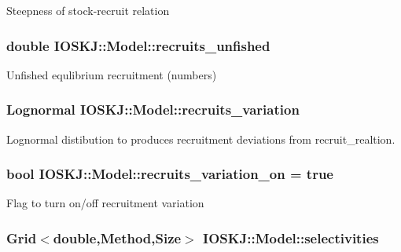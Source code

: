 Steepness of stock-\/recruit relation \hypertarget{classIOSKJ_1_1Model_a780f4e69674141e96e028765004608ea}{
\subsubsection[{recruits\-\_\-unfished}]{\setlength{\rightskip}{0pt plus 5cm}double I\-O\-S\-K\-J\-::\-Model\-::recruits\-\_\-unfished}}\label{classIOSKJ_1_1Model_a780f4e69674141e96e028765004608ea}
Unfished equlibrium recruitment (numbers) \hypertarget{classIOSKJ_1_1Model_ad9518caa30a28b5ae7afa7677e33bca2}{
\subsubsection[{recruits\-\_\-variation}]{\setlength{\rightskip}{0pt plus 5cm}Lognormal I\-O\-S\-K\-J\-::\-Model\-::recruits\-\_\-variation}}\label{classIOSKJ_1_1Model_ad9518caa30a28b5ae7afa7677e33bca2}
Lognormal distibution to produces recruitment deviations from recruit\-\_\-realtion. \hypertarget{classIOSKJ_1_1Model_a164e3c054caea071da7079d5ff27833b}{
\subsubsection[{recruits\-\_\-variation\-\_\-on}]{\setlength{\rightskip}{0pt plus 5cm}bool I\-O\-S\-K\-J\-::\-Model\-::recruits\-\_\-variation\-\_\-on = true}}\label{classIOSKJ_1_1Model_a164e3c054caea071da7079d5ff27833b}
Flag to turn on/off recruitment variation \hypertarget{classIOSKJ_1_1Model_a520b30af1796af1b4c1322d28291012c}{
\subsubsection[{selectivities}]{\setlength{\rightskip}{0pt plus 5cm}Grid$<$double,Method,Size$>$ I\-O\-S\-K\-J\-::\-Model\-::selectivities}}\label{classIOSKJ_1_1Model_a520b30af1796af1b4c1322d28291012c}
